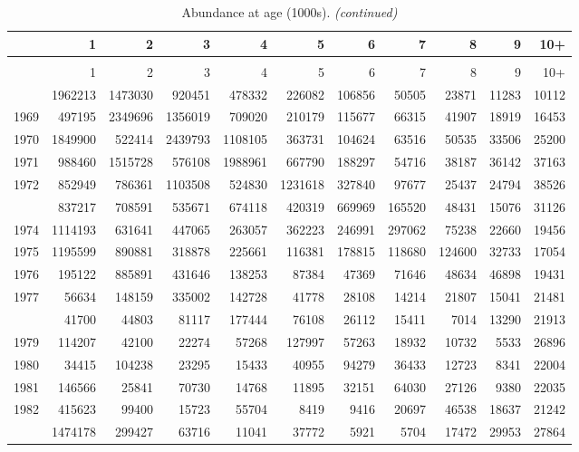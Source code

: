 \documentclass[
]{article}
\begin{document}
\begin{longtable}[t]{lrrrrrrrrrr}
\caption{\label{tab:NAA-table}Abundance at age (1000s).}\\
\toprule
  & 1 & 2 & 3 & 4 & 5 & 6 & 7 & 8 & 9 & 10+\\
\midrule
\endfirsthead
\caption[]{Abundance at age (1000s). \textit{(continued)}}\\
\toprule
  & 1 & 2 & 3 & 4 & 5 & 6 & 7 & 8 & 9 & 10+\\
\midrule
\endhead

\endfoot
\bottomrule
\endlastfoot
1968 & 1962213 & 1473030 & 920451 & 478332 & 226082 & 106856 & 50505 & 23871 & 11283 & 10112\\
1969 & 497195 & 2349696 & 1356019 & 709020 & 210179 & 115677 & 66315 & 41907 & 18919 & 16453\\
1970 & 1849900 & 522414 & 2439793 & 1108105 & 363731 & 104624 & 63516 & 50535 & 33506 & 25200\\
1971 & 988460 & 1515728 & 576108 & 1988961 & 667790 & 188297 & 54716 & 38187 & 36142 & 37163\\
1972 & 852949 & 786361 & 1103508 & 524830 & 1231618 & 327840 & 97677 & 25437 & 24794 & 38526\\
\addlinespace
1973 & 837217 & 708591 & 535671 & 674118 & 420319 & 669969 & 165520 & 48431 & 15076 & 31126\\
1974 & 1114193 & 631641 & 447065 & 263057 & 362223 & 246991 & 297062 & 75238 & 22660 & 19456\\
1975 & 1195599 & 890881 & 318878 & 225661 & 116381 & 178815 & 118680 & 124600 & 32733 & 17054\\
1976 & 195122 & 885891 & 431646 & 138253 & 87384 & 47369 & 71646 & 48634 & 46898 & 19431\\
1977 & 56634 & 148159 & 335002 & 142728 & 41778 & 28108 & 14214 & 21807 & 15041 & 21481\\
\addlinespace
1978 & 41700 & 44803 & 81117 & 177444 & 76108 & 26112 & 15411 & 7014 & 13290 & 21913\\
1979 & 114207 & 42100 & 22274 & 57268 & 127997 & 57263 & 18932 & 10732 & 5533 & 26896\\
1980 & 34415 & 104238 & 23295 & 15433 & 40955 & 94279 & 36433 & 12723 & 8341 & 22004\\
1981 & 146566 & 25841 & 70730 & 14768 & 11895 & 32151 & 64030 & 27126 & 9380 & 22035\\
1982 & 415623 & 99400 & 15723 & 55704 & 8419 & 9416 & 20697 & 46538 & 18637 & 21242\\
\addlinespace
1983 & 1474178 & 299427 & 63716 & 11041 & 37772 & 5921 & 5704 & 17472 & 29953 & 27864\\

\end{longtable}
\end{document}
